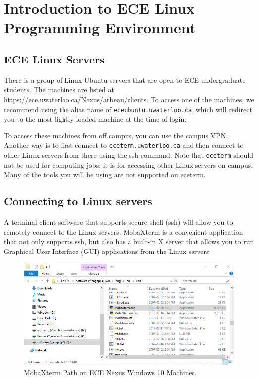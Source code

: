 \chapter{Introduction to ECE Linux Programming Environment}
\label{ch_linux_env}

\section{ECE Linux Servers}

There is a group of Linux Ubuntu servers that are open to ECE undergraduate students. The machines are listed at \url{https://ece.uwaterloo.ca/Nexus/arbeau/clients}. To access one of the machines, we recommend using the alias name of \verb+eceubuntu.uwaterloo.ca+, which will redirect you to the most lightly loaded machine at the time of login.

To access these machines from off campus, you can use the \href{https://uwaterloo.ca/information-systems-technology/services/virtual-private-network-vpn}{campus VPN}.
Another way is to first connect to \verb+eceterm.uwaterloo.ca+ and then connect to other Linux servers from there using the ssh command. Note that \verb+eceterm+ should not be used for computing jobs; it is for accessing other Linux servers on campus. Many of the tools you will be using are not supported on eceterm.

\section{Connecting to Linux servers}

A terminal client software that supports secure shell (ssh) will allow you to remotely connect to the Linux servers. MobaXterm is a convenient application that not only supports ssh, but also has a built-in X server that allows you to run Graphical User Interface (GUI) applications from the Linux servers.
\begin{figure}[!htb]
  \centering
  \includegraphics[width=5.5in]{img/lab0/MobaXterm/MobaXterm_Path}
  \caption{MobaXterm Path on ECE Nexus Windows 10 Machines.}
  \label{fig_MobaXterm_Path}
\end{figure}

